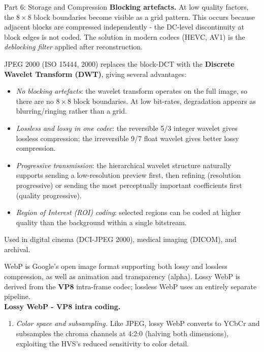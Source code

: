 \documentclass[letterpaper]{article}
\begin{document}
\begin{notes}{Part 6: Storage and Compression}
\textbf{Blocking artefacts.} At low quality factors, the $8\times8$ block boundaries become visible as a grid pattern. This occurs because adjacent blocks are compressed independently - the DC-level discontinuity at block edges is not coded. The solution in modern codecs (HEVC, AV1) is the \emph{deblocking filter} applied after reconstruction.


JPEG 2000 (ISO 15444, 2000) replaces the block-DCT with the \textbf{Discrete Wavelet Transform (DWT)}, giving several advantages:
\begin{itemize}
    \item \emph{No blocking artefacts}: the wavelet transform operates on the full image, so there are no $8\times8$ block boundaries. At low bit-rates, degradation appears as blurring/ringing rather than a grid.
    \item \emph{Lossless and lossy in one codec}: the reversible 5/3 integer wavelet gives lossless compression; the irreversible 9/7 float wavelet gives better lossy compression.
    \item \emph{Progressive transmission}: the hierarchical wavelet structure naturally supports sending a low-resolution preview first, then refining (resolution progressive) or sending the most perceptually important coefficients first (quality progressive).
    \item \emph{Region of Interest (ROI) coding}: selected regions can be coded at higher quality than the background within a single bitstream.
\end{itemize}
Used in digital cinema (DCI-JPEG 2000), medical imaging (DICOM), and archival.



WebP is Google's open image format supporting both lossy and lossless compression, as well as animation and transparency (alpha). Lossy WebP is derived from the \textbf{VP8} intra-frame codec; lossless WebP uses an entirely separate pipeline.\\

\textbf{Lossy WebP - VP8 intra coding.}


\begin{enumerate}
    \item \textit{Color space and subsampling.} Like JPEG, lossy WebP converts to YCbCr and subsamples the chroma channels at 4:2:0 (halving both dimensions), exploiting the HVS's reduced sensitivity to color detail.


\end{enumerate}
\end{notes}
\end{document}
